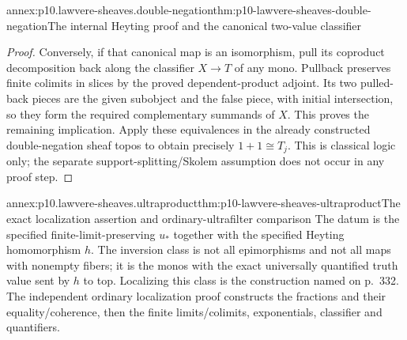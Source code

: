 \begin{annexitem}{annex:p10.lawvere-sheaves.double-negation}{thm:p10-lawvere-sheaves-double-negation}{The internal Heyting proof and the canonical two-value classifier}
\begin{proof}
Conversely, if that canonical map is an isomorphism,
pull its coproduct decomposition back along the
classifier \(X\to T\) of any mono.  Pullback
preserves finite colimits in slices by the proved
dependent-product adjoint.  Its two pulled-back
pieces are the given subobject and the false
piece, with initial intersection, so they form
the required complementary summands of \(X\).
This proves the remaining implication.
Apply these equivalences in the already constructed
double-negation sheaf topos to obtain precisely
\(1+1\cong T_j\).  This is classical logic only;
the separate support-splitting/Skolem assumption
does not occur in any proof step.
\end{proof}
\end{annexitem}

\begin{annexitem}{annex:p10.lawvere-sheaves.ultraproduct}{thm:p10-lawvere-sheaves-ultraproduct}{The exact localization assertion and ordinary-ultrafilter comparison}
The datum is the specified finite-limit-preserving \(u_*\)
together with the specified Heyting homomorphism \(h\).  The
inversion class is not all epimorphisms and not all maps with
nonempty fibers; it is the monos with the exact universally
quantified truth value sent by \(h\) to top.  Localizing this
class is the construction named on p.~332. The independent ordinary
localization proof constructs the fractions and their equality/coherence,
then the finite limits/colimits, exponentials, classifier and quantifiers.

\end{annexitem}
